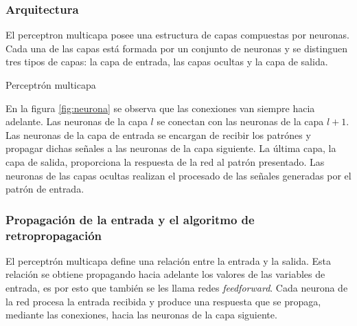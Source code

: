 \subsubsection{Arquitectura}
El perceptron multicapa posee una estructura de capas compuestas por neuronas. Cada una de las capas está formada por un conjunto de neuronas y se distinguen tres tipos de capas: la capa de entrada, las capas ocultas y la capa de salida.

\begin{imagen}
	\scalebox{0.8}{}
	\caption{Perceptrón multicapa}
	\label{fig:neurona}
\end{imagen}

En la figura \ref{fig:neurona} se observa que las conexiones van siempre hacia adelante. Las neuronas de la capa $l$ se conectan con las neuronas de la capa $l + 1$. Las neuronas de la capa de entrada se encargan de recibir los patrónes y propagar dichas señales a las neuronas de la capa siguiente. La última capa, la capa de salida, proporciona la respuesta de la red al patrón presentado. Las neuronas de las capas ocultas realizan el procesado de las señales generadas por el patrón de entrada.

\subsubsection{Propagación de la entrada y el algoritmo de retropropagación}
El perceptrón multicapa define una relación entre la entrada y la salida. Esta relación se obtiene propagando hacia adelante los valores de las variables de entrada, es por esto que también se les llama redes {\em feedforward}. Cada neurona de la red procesa la entrada recibida y produce una respuesta que se propaga, mediante las conexiones, hacia las neuronas de la capa siguiente.

